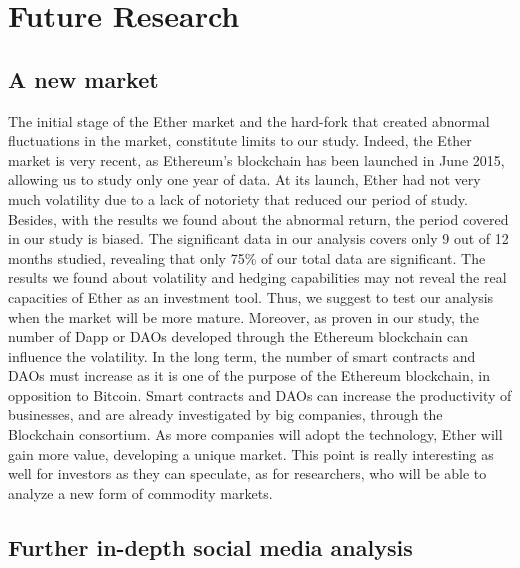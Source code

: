 \documentclass[11pt]{report}
\begin{document}
\section{Future Research}
\subsection*{A new market}
The initial stage of the Ether market and the hard-fork that created abnormal fluctuations in the market, constitute limits to our study. Indeed, the Ether market is very recent, as Ethereum's blockchain has been launched in June 2015, allowing us to study only one year of data. At its launch, Ether had not very much volatility due to a lack of notoriety that reduced our period of study. Besides, with the results we found about the abnormal return, the period covered in our study is biased. The significant data in our analysis covers only 9 out of 12 months studied, revealing that only 75\% of our total data are significant. The results we found about volatility and hedging capabilities may not reveal the real capacities of Ether as an investment tool. Thus, we suggest to test our analysis when the market will be more mature.\newline
Moreover, as proven in our study, the number of Dapp or DAOs developed through the Ethereum blockchain can influence the volatility. In the long term, the number of smart contracts and DAOs must increase as it is one of the purpose of the Ethereum blockchain, in opposition to Bitcoin. Smart contracts and DAOs can increase the productivity of businesses, and are already investigated by big companies, through the Blockchain consortium. As more companies will adopt the technology, Ether will gain more value, developing a unique market. This point is really interesting as well for investors as they can speculate, as for researchers, who will be able to analyze a new form of commodity markets.

\clearpage
\subsection*{Further in-depth social media analysis}
\end{document}
